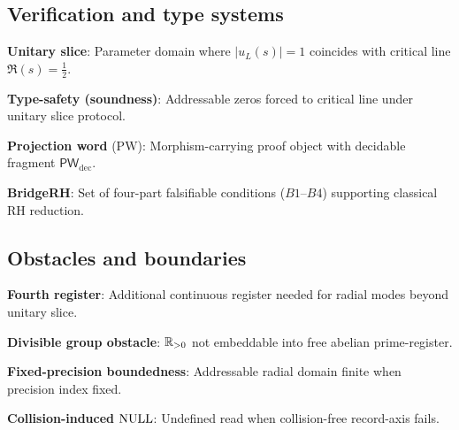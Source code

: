 \subsection{Verification and type systems}
\textbf{Unitary slice}: Parameter domain where $|u_L(s)|=1$ coincides with critical line $\Re(s)=\tfrac12$.\par
\textbf{Type-safety (soundness)}: Addressable zeros forced to critical line under unitary slice protocol.\par
\textbf{Projection word} ($\mathrm{PW}$): Morphism-carrying proof object with decidable fragment $\mathsf{PW}_{\mathrm{dec}}$.\par
\textbf{BridgeRH}: Set of four-part falsifiable conditions ($B1$--$B4$) supporting classical RH reduction.\par

\subsection{Obstacles and boundaries}
\textbf{Fourth register}: Additional continuous register needed for radial modes beyond unitary slice.\par
\textbf{Divisible group obstacle}: $\mathbb{R}_{>0}$ not embeddable into free abelian prime-register.\par
\textbf{Fixed-precision boundedness}: Addressable radial domain finite when precision index fixed.\par
\textbf{Collision-induced} $\mathrm{NULL}$: Undefined read when collision-free record-axis fails.\par
